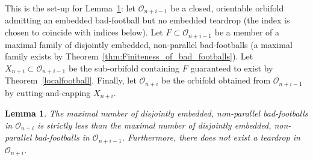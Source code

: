 \documentclass[12pt,reqno]{amsart}
\theoremstyle{plain}
\theoremstyle{definition}
\numberwithin{subcase}{case}
\theoremstyle{plain}
\newtheorem{lemm}[thm]{Lemma}
\theoremstyle{definition}
\newcommand{\OO}{\mathcal{O}}
\begin{document}
This is the set-up for Lemma~\ref{lemma:FewerBadFootballs}: let $\OO_{n+i-1}$ be a closed, orientable orbifold admitting an embedded bad-football but no embedded teardrop (the index is chosen to coincide with indices below). 
Let $F \subset \OO_{n+i-1}$ be a member of a maximal family of disjointly embedded, non-parallel bad-footballs (a maximal family exists by Theorem~\ref{thm:Finiteness_of_bad_footballs}). Let \(X_{n+i} \subset \OO_{n+i-1}\) be the sub-orbifold containing \(F\) guaranteed to exist by Theorem~\ref{localfootball}.  Finally, let \(\OO_{n+i}\) be the orbifold obtained from \(\OO_{n+i-1}\) by cutting-and-capping \(X_{n+i}\).






\begin{lemm}
The maximal number of disjointly embedded, non-parallel bad-footballs in $\OO_{n+i}$ is strictly less than the maximal number of disjointly embedded, non-parallel bad-footballs in $\OO_{n+i-1}$. Furthermore, there does not exist a teardrop in $\OO_{n+i}$.
\label{lemma:FewerBadFootballs}
\end{lemm}
\end{document}
